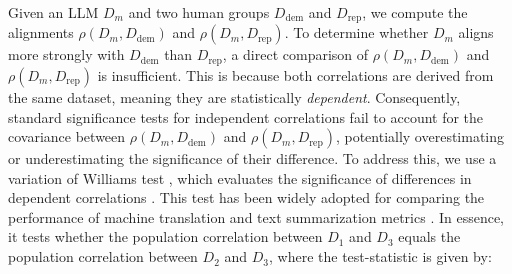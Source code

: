 Given an LLM \(D_m\) and two human groups \(D_{\mathrm{dem}}\) and \(D_{\mathrm{rep}}\), we compute the alignments \(\rho(D_m, D_{\mathrm{dem}})\) and \(\rho(D_m, D_{\mathrm{rep}})\).
To determine whether \(D_m\) aligns more strongly with \(D_{\mathrm{dem}}\) than \(D_{\mathrm{rep}}\), a direct comparison of \(\rho(D_m, D_{\mathrm{dem}})\) and \(\rho(D_m, D_{\mathrm{rep}})\) is insufficient. This is because both correlations are derived from the same dataset, meaning they are statistically \textit{dependent}. Consequently, standard significance tests for independent correlations fail to account for the covariance between \(\rho(D_m, D_{\mathrm{dem}})\) and \(\rho(D_m, D_{\mathrm{rep}})\), potentially overestimating or underestimating the significance of their difference. To address this, 
we use a variation of Williams test \citep{williams_regression_1959}, which evaluates the significance of differences in dependent correlations \cite{steiger1980tests}.
This test has been widely adopted for comparing the performance of machine translation and text summarization metrics \citep{mathur-etal-2020-tangled, deutsch-etal-2021-statistical,graham-baldwin-2014-testing}.
In essence, it tests whether the population correlation between \(D_1\) and \(D_3\) equals the population correlation between \(D_2\) and \(D_3\), where the test-statistic is given by:

